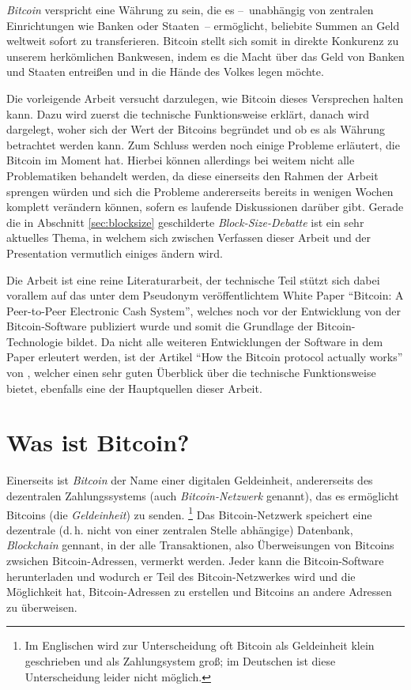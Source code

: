 \emph{Bitcoin} verspricht eine Währung zu sein, die es --~unabhängig von zentralen Einrichtungen wie Banken oder Staaten~-- ermöglicht, beliebite Summen an Geld weltweit sofort zu transferieren.
Bitcoin stellt sich somit in direkte Konkurenz zu unserem herkömlichen Bankwesen, indem es die Macht über das Geld von Banken und Staaten entreißen und in die Hände des Volkes legen möchte.

Die vorleigende Arbeit versucht darzulegen, wie Bitcoin dieses Versprechen halten kann.
Dazu wird zuerst die technische Funktionsweise erklärt, danach wird dargelegt, woher sich der Wert der Bitcoins begründet und ob es als Währung betrachtet werden kann.
Zum Schluss werden noch einige Probleme erläutert, die Bitcoin im Moment hat.
Hierbei können allerdings bei weitem nicht alle Problematiken behandelt werden, da diese einerseits den Rahmen der Arbeit sprengen würden und sich die Probleme andererseits bereits in wenigen Wochen komplett verändern können, sofern es laufende Diskussionen darüber gibt.
Gerade die in Abschnitt \ref{sec:blocksize} geschilderte \emph{Block-Size-Debatte} ist ein sehr aktuelles Thema, in welchem sich zwischen Verfassen dieser Arbeit und der Presentation vermutlich einiges ändern wird.

Die Arbeit ist eine reine Literaturarbeit, der technische Teil stützt sich dabei vorallem auf das unter dem Pseudonym  veröffentlichtem White Paper "`Bitcoin: A Peer-to-Peer Electronic Cash System"', welches noch vor der Entwicklung von der Bitcoin-Software publiziert wurde und somit die Grundlage der Bitcoin-Technologie bildet. \parencite{nakamoto}
Da nicht alle weiteren Entwicklungen der Software in dem Paper erleutert werden, ist der Artikel "`How the Bitcoin protocol actually works"' von , welcher einen sehr guten Überblick über die technische Funktionsweise bietet, ebenfalls eine der Hauptquellen dieser Arbeit. \parencite{nielsen}

\section{Was ist Bitcoin?}
\label{sec:bitcoinintro}

Einerseits ist \emph{Bitcoin} der Name einer digitalen Geldeinheit, andererseits des dezentralen Zahlungssystems (auch \emph{Bitcoin-Netzwerk} genannt), das es ermöglicht Bitcoins (die \emph{Geldeinheit}) zu senden.%
\footnote{Im Englischen wird zur Unterscheidung oft Bitcoin als Geldeinheit klein geschrieben und als Zahlungsystem groß; im Deutschen ist diese Unterscheidung leider nicht möglich.}
Das Bitcoin-Netzwerk speichert eine dezentrale (d.\,h. nicht von einer zentralen Stelle abhängige) Datenbank, \emph{Blockchain} gennant, in der alle Transaktionen, also Überweisungen von Bitcoins zwsichen Bitcoin-Adressen, vermerkt werden.
Jeder kann die Bitcoin-Software herunterladen und wodurch er Teil des Bitcoin-Netzwerkes wird und die Möglichkeit hat, Bitcoin-Adressen zu erstellen und Bitcoins an andere Adressen zu überweisen.
